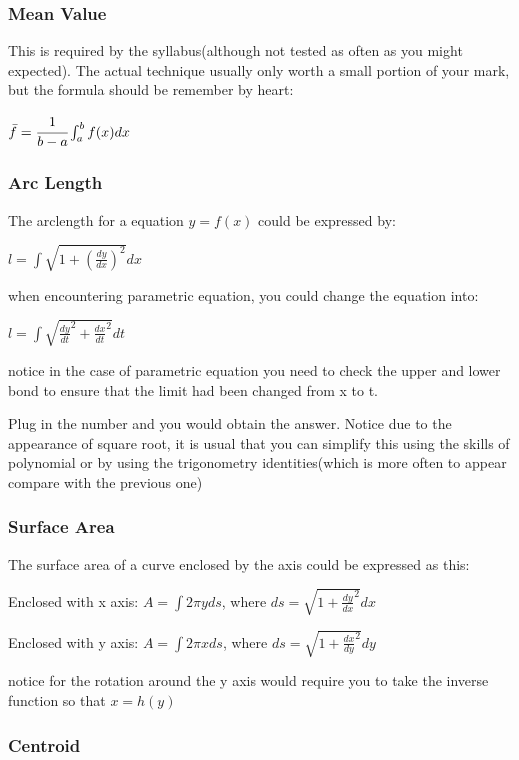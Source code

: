\documentclass[]{article}
\begin{document}
\subsubsection{Mean Value}\label{header-n135}

This is required by the syllabus(although not tested as often as you
might expected). The actual technique usually only worth a small portion
of your mark, but the formula should be remember by heart:

\(\bar{f} = \cfrac{1}{b-a} \int_a^b f(x) dx\)

\subsubsection{Arc Length}\label{header-n138}

The arclength for a equation \(y = f(x)\) could be expressed by:

\(l = \int{\sqrt{1 + (\frac{dy}{dx})^2} dx}\)

when encountering parametric equation, you could change the equation
into:

\(l = \int{\sqrt{{\frac{dy}{dt}}^2 + {\frac{dx}{dt}}^2}}dt\)

notice in the case of parametric equation you need to check the upper
and lower bond to ensure that the limit had been changed from x to t.

Plug in the number and you would obtain the answer. Notice due to the
appearance of square root, it is usual that you can simplify this using
the skills of polynomial or by using the trigonometry identities(which
is more often to appear compare with the previous one)

\subsubsection{Surface Area}\label{header-n145}

The surface area of a curve enclosed by the axis could be expressed as
this:

Enclosed with x axis: \(A = \int 2\pi y ds\), where
\(ds = \sqrt{1+{\frac{dy}{dx}}^2}dx\)

Enclosed with y axis: \(A = \int 2\pi x ds\), where
\(ds = \sqrt{1+{\frac{dx}{dy}}^2}dy\)

notice for the rotation around the y axis would require you to take the
inverse function so that \(x = h(y)\)

\subsubsection{Centroid}\label{header-n150}
\end{document}
